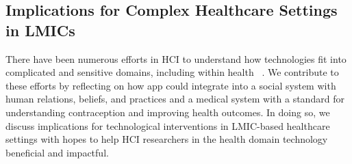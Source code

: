 \subsection{Implications for Complex Healthcare Settings in LMICs}
There have been numerous efforts in HCI to understand how technologies fit into complicated and sensitive domains, including within health ~\cite{10.1145/3613904.3642245, 10.1145/3637323, 10.1145/3411764.3445410, 10.1145/3313831.3376465}. We contribute to these efforts by reflecting on how  app could integrate into a social system with human relations, beliefs, and practices and a medical system with a standard for understanding contraception and improving health outcomes. In doing so, we discuss implications for technological interventions in LMIC-based healthcare settings with hopes to help HCI researchers in the health domain  technology  beneficial and impactful. 

